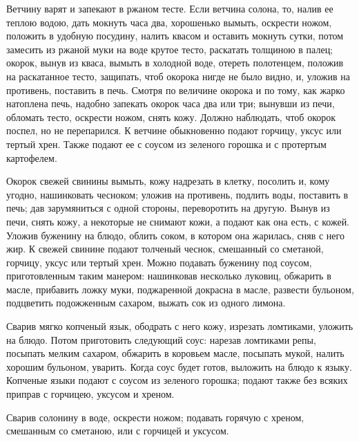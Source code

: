 
Ветчину варят и запекают в ржаном тесте. Если ветчина солона, то, налив ее теплою водою, дать мокнуть часа два, хорошенько вымыть, оскрести ножом, положить в удобную посудину, налить квасом и оставить мокнуть сутки, потом замесить из ржаной муки на воде крутое тесто, раскатать толщиною в палец; окорок, вынув из кваса, вымыть в холодной воде, отереть полотенцем, положив на раскатанное тесто, защипать, чтоб окорока нигде не было видно, и, уложив на противень, поставить в печь. Смотря по величине окорока и по тому, как жарко натоплена печь, надобно запекать окорок часа два или три; вынувши из печи, обломать тесто, оскрести ножом, снять кожу. Должно наблюдать, чтоб окорок поспел, но не перепарился. К ветчине обыкновенно подают горчицу, уксус или тертый хрен. Также подают ее с соусом из зеленого горошка и с протертым картофелем. 


Окорок свежей свинины вымыть, кожу надрезать в клетку, посолить и, кому угодно, нашинковать чесноком; уложив на противень, подлить воды, поставить в печь; дав зарумяниться с одной стороны, переворотить на другую. Вынув из печи, снять кожу, а некоторые не снимают кожи, а подают как она есть, с кожей. Уложив буженину на блюдо, облить соком, в котором она жарилась, сняв с него жир. К свежей свинине подают толченый чеснок, смешанный со сметаной, горчицу, уксус или тертый хрен. Можно подавать буженину под соусом, приготовленным таким манером: нашинковав несколько луковиц, обжарить в масле, прибавить ложку муки, поджаренной докрасна в масле, развести бульоном, подцветить подожженным сахаром, выжать сок из одного лимона.


Сварив мягко копченый язык, ободрать с него кожу, изрезать ломтиками, уложить на блюдо. Потом приготовить следующий соус: нарезав ломтиками репы, посыпать мелким сахаром, обжарить в коровьем масле, посыпать мукой, налить хорошим бульоном, уварить. Когда соус будет готов, выложить на блюдо к языку. Копченые языки подают с соусом из зеленого горошка; подают также без всяких приправ с горчицею, уксусом и хреном. 


Сварив солонину в воде, оскрести ножом; подавать горячую с хреном, смешанным со сметаною, или с горчицей и уксусом. 


